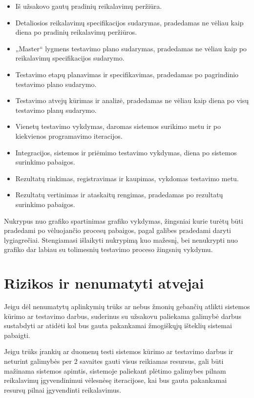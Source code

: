 \documentclass{VUMIFPSkursinis}
\begin{document}
    \begin{itemize}
    	\item Iš užsakovo gautų pradinių reikalavimų peržiūra.
    	\item Detaliosios reikalavimų specifikacijos sudarymas, pradedamas ne vėliau kaip diena po pradinių reikalavimų peržiūros.
    	\item „Master“ lygmens testavimo plano sudarymas, pradedamas ne vėliau kaip po reikalavimų specifikacijos sudarymo.
    	\item Testavimo etapų planavimas ir specifikavimas, pradedamas po pagrindinio testavimo plano sudarymo.
    	\item Testavimo atvejų kūrimas ir analizė, pradedamas ne vėliau kaip diena po visų testavimo planų sudarymo.
    	\item Vienetų testavimo vykdymas, daromas sistemos surikimo metu ir po kiekvienos programavimo iteracijos.
    	\item Integracijos, sistemos ir priėmimo testavimo vykdymas, diena po sistemos surinkimo pabaigos.
    	\item Rezultatų rinkimas, registravimas ir kaupimas, vykdomas testavimo metu.
    	\item Rezultatų vertinimas ir ataskaitų rengimas, pradedamas po rezultatų surinkimo pabaigos.
    \end{itemize}

    Nukrypus nuo grafiko spartinimas grafiko vykdymas, žingsniai kurie turėtų būti pradedami po vėluojančio procesų pabaigos, pagal galibes pradedami daryti lygiagrečiai. 
    Stengiamasi išlaikyti nukrypimą kuo mažesnį, bei nenukrypti nuo grafiko dar labiau su tolimesnių testavimo proceso žingsnių vykdymu. 
    
    \section{Rizikos ir nenumatyti atvejai}

    Jeigu dėl nenumatytų aplinkymių trūks ar nebus žmonių gebančių atlikti sistemos kūrimo ar testavimo darbus, 
     suderinus su užsakovu paliekama galimybė darbus sustabdyti ar atidėti kol bus gauta pakankamai žmogiškųjų išteklių sistemai pabaigti. 

    Jeigu trūks įrankių ar duomenų testi sistemos kūrimo ar testavimo darbus ir neturint galimybės per 2 savaites gauti visus reikiamas resursus,
     gali būti mažinama sistemos apimtis, sistemoje paliekant plėtimo galimybes pilnam reikalavimų įgyvendinimui vėlesnėsę iteracijose, 
     kai bus gauta pakankamai resursų pilnai įgyvendinti reikalavimus.
\end{document}

